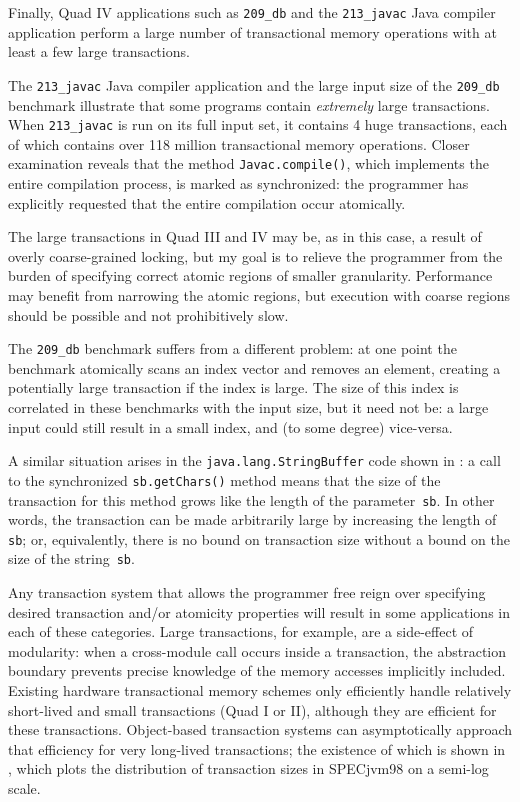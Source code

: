 Finally, Quad IV applications such as \texttt{209\_db} and the
\texttt{213\_javac} Java compiler application perform a large number
of transactional memory operations with at least a few large transactions.  

The \texttt{213\_javac} Java compiler application and the large input
size of the \texttt{209\_db} benchmark illustrate that some programs
contain \emph{extremely} large transactions.  When \texttt{213\_javac}
is run on its full input set, it contains 4 huge transactions,
each of which contains over 118 million transactional memory
operations.  Closer
examination reveals that the method \texttt{Javac.compile()}, which
implements the entire compilation process, is marked as synchronized:
the programmer has explicitly requested that the entire compilation
occur atomically.

The large transactions in Quad III and IV may be, as in this case, a result of
overly coarse-grained locking, but my goal is to
relieve the programmer from the burden of specifying correct
atomic regions of smaller granularity.  Performance may benefit from
narrowing the atomic regions, but execution with coarse regions should
be possible and not prohibitively slow.

The \texttt{209\_db} benchmark suffers from a different problem: at one
point the benchmark atomically scans an index vector and removes an
element, creating a potentially large transaction if the index is
large.  The size of this index is correlated in these benchmarks with
the input size, but it need not be: a large input could still result
in a small index, and (to some degree) vice-versa.

A similar situation arises in the {\tt java.lang.StringBuffer} code
shown in :  a call to the synchronized
\texttt{sb.getChars()} method means that
the size of the transaction for this method grows like the length
of the parameter~\texttt{sb}.  In other words, the transaction can be
made arbitrarily large by increasing the length of \texttt{sb}; or,
equivalently, there is no bound on transaction size without a bound on
the size of the string~\texttt{sb}.


Any transaction system that allows the programmer free reign over specifying
desired transaction and/or atomicity properties will result
in some applications in each of these categories.  Large transactions,
for example, are a side-effect of modularity: when a cross-module call
occurs inside a transaction, the abstraction boundary prevents precise
knowledge of the memory accesses implicitly included.  Existing
hardware transactional memory schemes only efficiently handle
relatively short-lived and small transactions (Quad I or II),
although they are efficient for these transactions.  Object-based
transaction systems can asymptotically approach that efficiency for
very long-lived transactions;  the existence of which is shown in
, which plots
the distribution of transaction sizes in SPECjvm98
on a semi-log scale.


